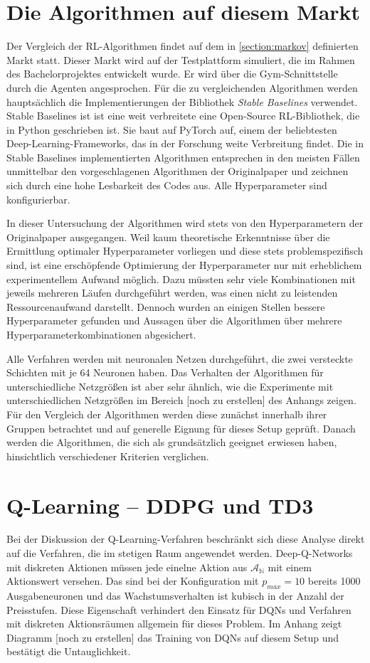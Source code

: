 \section{Die Algorithmen auf diesem Markt}
Der Vergleich der RL-Algorithmen findet auf dem in \ref{section:markov} definierten Markt statt.
Dieser Markt wird auf der Testplattform simuliert, die im Rahmen des Bachelorprojektes entwickelt wurde.
Er wird über die Gym-Schnittstelle durch die Agenten angesprochen.
Für die zu vergleichenden Algorithmen werden hauptsächlich die Implementierungen der Bibliothek \textit{Stable Baselines} verwendet. \cite{stable-baselines}
Stable Baselines ist ist eine weit verbreitete eine Open-Source RL-Bibliothek, die in Python geschrieben ist.
Sie baut auf PyTorch auf, einem der beliebtesten Deep-Learning-Frameworks, das in der Forschung weite Verbreitung findet. \cite{NEURIPS2019_9015}
Die in Stable Baselines implementierten Algorithmen entsprechen in den meisten Fällen unmittelbar den vorgeschlagenen Algorithmen der Originalpaper und zeichnen sich durch eine hohe Lesbarkeit des Codes aus.
Alle Hyperparameter sind konfigurierbar.

In dieser Untersuchung der Algorithmen wird stets von den Hyperparametern der Originalpaper ausgegangen.
Weil kaum theoretische Erkenntnisse über die Ermittlung optimaler Hyperparameter vorliegen und diese stets problemspezifisch sind, ist eine erschöpfende Optimierung der Hyperparameter nur mit erheblichem experimentellem Aufwand möglich.
Dazu müssten sehr viele Kombinationen mit jeweils mehreren Läufen durchgeführt werden, was einen nicht zu leistenden Ressourcenaufwand darstellt.
Dennoch wurden an einigen Stellen bessere Hyperparameter gefunden und Aussagen über die Algorithmen über mehrere Hyperparameterkombinationen abgesichert.

Alle Verfahren werden mit neuronalen Netzen durchgeführt, die zwei versteckte Schichten mit je 64 Neuronen haben.
Das Verhalten der Algorithmen für unterschiedliche Netzgrößen ist aber sehr ähnlich, wie die Experimente mit unterschiedlichen Netzgrößen im Bereich [noch zu erstellen] des Anhangs zeigen.
Für den Vergleich der Algorithmen werden diese zunächst innerhalb ihrer Gruppen betrachtet und auf generelle Eignung für dieses Setup geprüft.
Danach werden die Algorithmen, die sich als grundsätzlich geeignet erwiesen haben, hinsichtlich verschiedener Kriterien verglichen.

\section{Q-Learning -- DDPG und TD3}
Bei der Diskussion der Q-Learning-Verfahren beschränkt sich diese Analyse direkt auf die Verfahren, die im stetigen Raum angewendet werden.
Deep-Q-Networks mit diskreten Aktionen müssen jede einelne Aktion aus $\mathcal{A_\mathbb{N}}$ mit einem Aktionswert versehen.
Das sind bei der Konfiguration mit $p_{max}=10$ bereits 1000 Ausgabeneuronen und das Wachstumsverhalten ist kubisch in der Anzahl der Preisstufen.
Diese Eigenschaft verhindert den Einsatz für DQNs und Verfahren mit diskreten Aktionsräumen allgemein für dieses Problem.
Im Anhang zeigt Diagramm [noch zu erstellen] das Training von DQNs auf diesem Setup und bestätigt die Untauglichkeit.

